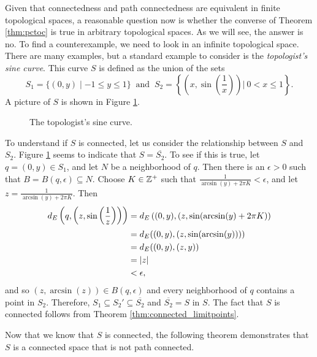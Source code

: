 \label{sec_connect_infinite}

Given that connectedness and path connectedness are equivalent in finite topological spaces, a reasonable question now is whether the converse of Theorem \ref{thm:pctoc} is true in arbitrary topological spaces. As we will see, the answer is no. To find a counterexample, we need to look in an infinite topological space. There are many examples, but a standard example to consider is the \emph{topologist's sine curve}. This curve $S$ is defined as the union of the sets
\[S_1 = \{(0,y) \mid -1 \leq y \leq 1\}  \ \text{ and } \ S_2 = \left\{ \left(x,\sin\left(\frac{1}{x}\right)\right) \Big| \ 0 < x \leq 1\right\}.\]
A picture of $S$ is shown in Figure \ref{F:T_sin}.  
\begin{figure}[h]
\begin{center}
\end{center}
\caption{The topologist's sine curve.}
\label{F:T_sin}
\end{figure}



To understand if $S$ is connected, let us consider the relationship between $S$ and $S_2$. Figure \ref{F:T_sin} seems to indicate that $S = \overline{S_2}$. To see if this is true, let $q=(0,y) \in S_1$, and let $N$ be a neighborhood of $q$. Then there is an $\epsilon > 0$ such that $B = B(q, \epsilon) \subseteq N$. Choose $K \in \mathbb{Z}^+$ such that $\frac{1}{\arcsin(y)+2 \pi K} < \epsilon$, and let $z = \frac{1}{\arcsin(y)+2 \pi K}$. Then
\begin{align*}
d_E\left(q,\left(z, \sin\left(\frac{1}{z}\right)\right)\right) &=  d_E\left((0,y),(z, \sin(\arcsin(y)+2 \pi K)\right) \\
	&= d_E((0,y), (z,\sin(\arcsin(y)))) \\
	&= d_E((0,y), (z,y)) \\
	&= \left| z \right| \\
	&< \epsilon,
	\end{align*}
and so $\left(z, \arcsin(z)\right) \in B(q, \epsilon)$ and every neighborhood of $q$ contains a point in $S_2$. Therefore, $S_1 \subseteq S_2' \subseteq \overline{S_2}$ and $\overline{S_2} = S$ in $S$.  The fact that $S$ is connected follows from Theorem \ref{thm:connected_limitpoints}. 

Now that we know that $S$ is connected, the following theorem demonstrates that $S$ is a connected space that is not path connected. 

